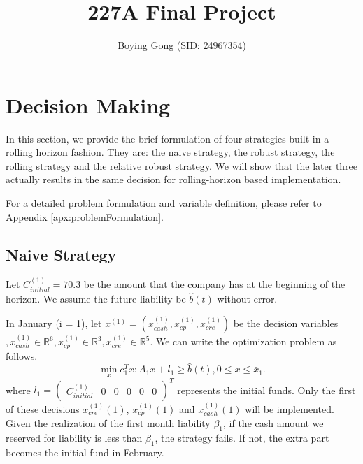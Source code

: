 \documentclass{article}
\title{227A Final Project}
\author{Boying Gong (SID: 24967354)}
\begin{document}
\twocolumn

\maketitle






\section{\textbf{Decision Making}}

In this section, we provide the brief formulation of four strategies built in a rolling horizon fashion. They are: the naive strategy, the robust strategy, the rolling strategy and the relative robust strategy. We will show that the later three actually results in the same decision for rolling-horizon based implementation.

For a detailed problem formulation and variable definition, please refer to Appendix \ref{apx:problemFormulation}.


\subsection{Naive Strategy}

    Let $C^{(1)}_{initial} = 70.3$ be the amount that the company has at the beginning of the horizon. We assume the future liability be $\hat{b}(t)$ without error.

    In January (i = 1), let $x^{(1)}=(x^{(1)}_{cash}, x^{(1)}_{cp}, x^{(1)}_{cre})$ be the decision variables $, x^{(1)}_{cash}\in\mathbb{R}^6, x^{(1)}_{cp}\in\mathbb{R}^3, x^{(1)}_{cre}\in\mathbb{R}^5$. We can write the optimization problem as follows.
    \begin{equation}
        \min_x c_1^Tx: A_1x+l_1\geq\hat{b}(t), 0\leq x\leq \bar{x}_1.
    \end{equation}
    where $l_1=\begin{pmatrix}C^{(1)}_{initial} & 0& 0& 0& 0& 0\end{pmatrix}^T$ represents the initial funds. Only the first of these decisions $x^{(1)}_{cre}(1)$, $x^{(1)}_{cp}(1)$ and $x^{(1)}_{cash}(1)$ will be implemented. Given the realization of the first month liability $\beta_1$, if the cash amount we reserved for liability is less than $\beta_1$, the strategy fails. If not, the extra part becomes the initial fund in February.
\end{document}
